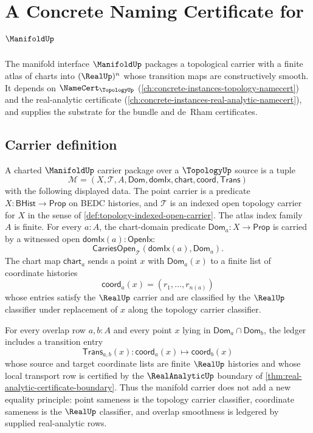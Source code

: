 \chapter{A Concrete Naming Certificate for $\ManifoldUp$}
\label{ch:concrete-instances-manifold-namecert}

The manifold interface $\ManifoldUp$ packages a topological carrier with a finite atlas of charts into $(\RealUp)^n$ whose transition maps are constructively smooth. It depends on $\NameCert_{\TopologyUp}$ (\autoref{ch:concrete-instances-topology-namecert}) and the real-analytic certificate (\autoref{ch:concrete-instances-real-analytic-namecert}), and supplies the substrate for the bundle and de~Rham certificates.

\section{Carrier definition}
\label{sec:manifold-carrier}

\begin{definition}
\label{def:manifold-charted-carrier}
A charted $\ManifoldUp$ carrier package over a $\TopologyUp$ source is a tuple
$$
\mathcal{M}=(X,\mathcal{T},A,\mathsf{Dom},\mathsf{domIx},\mathsf{chart},\mathsf{coord},\mathsf{Trans})
$$
with the following displayed data. The point carrier is a predicate
$X:\mathsf{BHist}\to\mathsf{Prop}$ on BEDC histories, and
$\mathcal{T}$ is an indexed open topology carrier for $X$ in the sense of
\autoref{def:topology-indexed-open-carrier}. The atlas index family $A$ is
finite. For every $a:A$, the chart-domain predicate
$\mathsf{Dom}_a:X\to\mathsf{Prop}$ is carried by a witnessed open
$\mathsf{domIx}(a):\mathsf{OpenIx}$:
$$
\mathsf{CarriesOpen}_{\mathcal{T}}(\mathsf{domIx}(a),\mathsf{Dom}_a).
$$
The chart map $\mathsf{chart}_a$ sends a point $x$ with
$\mathsf{Dom}_a(x)$ to a finite list of coordinate histories
$$
\mathsf{coord}_a(x)=(r_1,\ldots,r_{n(a)})
$$
whose entries satisfy the $\RealUp$ carrier and are classified by the
$\RealUp$ classifier under replacement of $x$ along the topology carrier
classifier.

For every overlap row $a,b:A$ and every point $x$ lying in
$\mathsf{Dom}_a\cap\mathsf{Dom}_b$, the ledger includes a transition entry
$$
\mathsf{Trans}_{a,b}(x):
\mathsf{coord}_a(x)\longmapsto \mathsf{coord}_b(x)
$$
whose source and target coordinate lists are finite $\RealUp$ histories and
whose local transport row is certified by the $\RealAnalyticUp$ boundary of
\autoref{thm:real-analytic-certificate-boundary}. Thus the manifold carrier
does not add a new equality principle: point sameness is the topology carrier
classifier, coordinate sameness is the $\RealUp$ classifier, and overlap
smoothness is ledgered by supplied real-analytic rows.
\end{definition}

